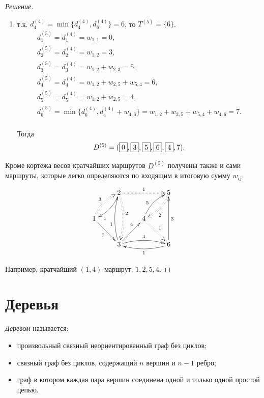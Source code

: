 \begin{proof}[Решение]
\begin{enumerate}
        \item т.к. $d_4^{(4)}=\min\{d_4^{(4)},d_6^{(4)}\}=6$, то $T^{(5)}=\{6\}$.
        \[
            \begin{split}
                d_1^{(5)}=d_1^{(4)}=w_{1,1}=0,\\
                d_2^{(5)}=d_2^{(4)}=w_{1,2}=3,\\
                d_3^{(5)}=d_3^{(4)}=w_{1,2}+w_{2,3}=5,\\
                d_4^{(5)}=d_4^{(4)}=w_{1,2}+w_{2,5}+w_{5,4}=6,\\
                d_5^{(5)}=d_5^{(4)}=w_{1,2}+w_{2,5}=4,\\
                d_6^{(5)}=\min\{d_6^{(4)}, d_4^{(4)}+w_{4,6}\}=w_{1,2}+w_{2,5}+w_{5,4}+w_{4,6}=7.\\
            \end{split}
        \]
        
        Тогда
        \[
            D^{(5)}=(\fbox{0},\fbox{3},\fbox{5},\fbox{6},\fbox{4},7).
        \]        
    \end{enumerate}
    
    Кроме кортежа весов кратчайших маршрутов $D^{(5)}$ получены также и сами маршруты, которые легко определяются по входящим в итоговую сумму $w_{ij}$. 
    \[    
        {\xymatrix{
            *{}
                &2 \ar@{:>}[rr]^1 \ar@{:>}@/^/[dd]^(.4)2 \ar@{->}@/^/[dl]^(.75)1
                    &*{}
                        &5 \ar@{:>}@/^/[dl]^(.6)2
                            \\
            1 \ar@{:>}@/^/[ur]^3 \ar@{->}[dr]_7
                &*{}
                    &4 \ar@{->}@/^/[ur]^(.4)5 \ar@{:>}[dr]^1
                        &*{}
                            \\
            *{}
                &3 \ar@{->}@/^/[uu]^(.4)1 \ar@{->}[ur]^(.65)4 \ar@{->}@/^/[rr]^4
                    &*{}
                        &6 \ar@{->}@/^/[ll]^1 \ar@{->}[uu]_3
        }}
    \]    
    
    Например, кратчайший $(1,4)$-маршрут: $1,2,5,4$.
\end{proof}


\section{Деревья}

\emph{Деревом} называется:
\begin{itemize}
    \item произвольный связный неориентированный граф без циклов;
    \item связный граф без циклов, содержащий $n$ вершин и $n-1$ ребро;
    \item граф в котором каждая пара вершин соединена одной и только одной простой цепью.
\end{itemize}

